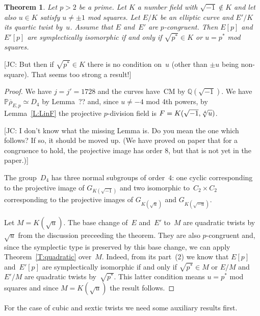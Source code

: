 \documentclass[12pt, reqno]{amsart}
\newcommand{\PP}{\mathbb{P}}
\newcommand{\Q}{\mathbb{Q}}
\newcommand{\rhobar}{{\overline{\rho}}}
\numberwithin{equation}{section}
\newtheorem{theorem}{Theorem}[section]
\theoremstyle{definition}
\theoremstyle{remark}
\newcommand{\jc}[1]{{\color{darkgreen} \textsf{[JC: #1]}}}
\begin{document}
\begin{theorem}\label{T:quarticM} 
Let $p > 2$ be a prime. Let $K$ a number field with $\sqrt{-1} \not\in K$ and let also $u \in K$ satisfy $u \neq \pm 1$ mod squares. 
Let $E/K$ be an elliptic curve and $E'/K$
its quartic twist by~$u$.
Assume that $E$ and~$E'$ are $p$-congruent.
Then $E[p]$ and~$E'[p]$ are symplectically isomorphic if and only if
$\sqrt{p^*} \in K$ or $u = p^*$ mod squares.
\end{theorem}

\jc{But then if $\sqrt{p^*}\in K$ there is no condition on~$u$ (other
  than $\pm u$ being non-square).  That seems too strong a result!}

\begin{proof} 
We have $j=j'=1728$ and the curves have~CM by $\Q(\sqrt{-1})$. We have
$\PP \rhobar_{E,p} \simeq D_4$ by Lemma~?? and, since $u \neq -4$ mod
4th powers, by Lemma~\ref{L:LinF} the projective $p$-division field is
$F = K(\sqrt{-1},\root 4 \of u)$.

\jc{I don't know what the missing Lemma is.  Do you mean the one which
  follows?  If so, it should be moved up.  (We have proved on paper
  that for a congruence to hold, the projective image has order 8, but
  that is not yet in the paper.)}

The group~$D_4$ has three normal subgroups of order~$4$: one cyclic corresponding to the projective image of $G_{K(\sqrt{-1})}$ and two isomorphic to~$C_2 \times C_2$ corresponding to the projective images of
$G_{K(\sqrt{u})}$ and $G_{K(\sqrt{-u})}$.

Let $M = K(\sqrt{u})$. 
The base change of~$E$ and~$E'$  
to~$M$ are quadratic twists by~$\sqrt{u}$ from the discussion preceeding the theorem. They are also $p$-congruent and,  since the 
symplectic type is preserved by this base change, we can apply Theorem~\ref{T:quadratic} over~$M$.  
Indeed, from its part~(2) we know that
$E[p]$ and~$E'[p]$ are symplectically isomorphic if and only if $\sqrt{p^*} \in M$ 
or $E/M$ and $E'/M$ are quadratic twists by~$\sqrt{p^*}$. 
This latter condition means $u = p^*$ mod squares and since $M = K(\sqrt{u})$ the result follows.
\end{proof}

For the case of cubic and sextic twists we need some auxiliary results first. 
\end{document}
